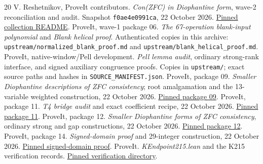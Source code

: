 \documentclass[11pt]{article}
\newcommand{\src}[1]{\nolinkurl{#1}}
\theoremstyle{remark}\newtheorem{remark}[theorem]{Remark}
\begin{document}
\begin{thebibliography}{20}\small
{} V. Reshetnikov, ProveIt contributors.
\emph{Con(ZFC) in Diophantine form}, wave-2 reconciliation and audit.
Snapshot \src{f0ae4e0991ca}, 22 October 2026.
\href{https://github.com/VladimirReshetnikov/ProveIt/blob/f0ae4e0991ca44a7bb4e5671d42e33d775e48035/SetTheory/Cardinals/docs/reports/hilbert-tenth-problem/con-zfc-diophantine-forms/README.md}{Pinned collection README}.
 ProveIt, wave-1 package 06.
\emph{The 67-operation blank-input polynomial} and
\emph{Blank helical proof}. Authenticated copies in this archive:
\src{upstream/normalized_blank_proof.md} and \src{upstream/blank_helical_proof.md}.
 ProveIt, native-window/Pell development.
\emph{Pell lemma audit}, ordinary strong-rank interface, and signed auxiliary
congruence proofs. Copies in \src{upstream/}; exact source paths and hashes
in \src{SOURCE_MANIFEST.json}.
 ProveIt, package 09.
\emph{Smaller Diophantine descriptions of ZFC consistency}; root amalgamation
and the 13-variable weighted construction, 22 October 2026.
\href{https://github.com/VladimirReshetnikov/ProveIt/tree/f0ae4e0991ca44a7bb4e5671d42e33d775e48035/SetTheory/Cardinals/docs/reports/hilbert-tenth-problem/con-zfc-diophantine-forms/09-combined13}{Pinned package 09}.
 ProveIt, package 11.
\emph{T4 bridge audit} and exact coefficient recipe, 22 October 2026.
\href{https://github.com/VladimirReshetnikov/ProveIt/tree/f0ae4e0991ca44a7bb4e5671d42e33d775e48035/SetTheory/Cardinals/docs/reports/hilbert-tenth-problem/con-zfc-diophantine-forms/11-t4}{Pinned package 11}.
 ProveIt, package 12.
\emph{Smaller Diophantine forms of ZFC consistency}, ordinary strong and gap
constructions, 22 October 2026.
\href{https://github.com/VladimirReshetnikov/ProveIt/tree/f0ae4e0991ca44a7bb4e5671d42e33d775e48035/SetTheory/Cardinals/docs/reports/hilbert-tenth-problem/con-zfc-diophantine-forms/12-gap-norm14}{Pinned package 12}.
 ProveIt, package 14.
\emph{Signed-domain proof} and 29-integer construction, 22 October 2026.
\href{https://github.com/VladimirReshetnikov/ProveIt/blob/f0ae4e0991ca44a7bb4e5671d42e33d775e48035/SetTheory/Cardinals/docs/reports/hilbert-tenth-problem/con-zfc-diophantine-forms/14-integer29/proofs/signed_domain_proof.md}{Pinned signed-domain proof}.
 ProveIt.
\emph{KEndpoint215.lean} and the K215 verification records.
\href{https://github.com/VladimirReshetnikov/ProveIt/tree/f0ae4e0991ca44a7bb4e5671d42e33d775e48035/Computability/BusyBeaver/Research/ZFC/k225-formal/verification/k215}{Pinned verification directory}.

\end{thebibliography}
\end{document}
